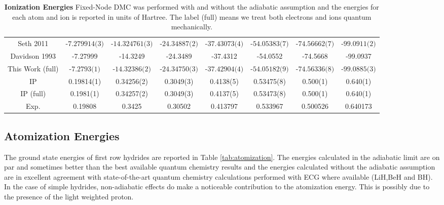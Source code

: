 \documentclass[aps,prl,superscriptaddress,groupedaddress]{revtex4}
\begin{document}
\begin{table*}[htpb!]
\begin{tabular}{*{1}{*{8}{c}}}
Seth 2011 \cite{Seth_Bench} & $\text{-7.279914(3)}$ & $\text{-14.324761(3)}$ & $\text{-24.34887(2)}$ & $\text{-37.43073(4)}$ & $\text{-54.05383(7)}$ & $\text{-74.56662(7)}$ & $\text{-99.0911(2)}$ \\
Davidson 1993 \footnotemark[1] \cite{Davidson_Atoms} & -7.27999 & -14.3249 & -24.3489 & -37.4312 & -54.0552 & -74.5668 & -99.0937 \\
This Work (full) & $\text{-7.2793(1)}$ & $\text{-14.32386(2)}$ & $\text{-24.34750(3)}$ & $\text{-37.42904(4)}$ & $\text{-54.05182(9)}$ & $\text{-74.56336(8)}$ & $\text{-99.0885(3)}$ \\
\hline
IP & 0.19814(1) & 0.34256(2) & 0.3049(3) & 0.4138(5) & 0.53475(8) & 0.500(1) & 0.640(1) \\
IP (full) & 0.1981(1) & 0.34257(2) & 0.3049(3) & 0.4137(5) & 0.53473(8) & 0.500(1) & 0.640(1) \\
Exp. \cite{Davidson_Atoms} & 0.19808 & 0.3425 & 0.30502 & 0.413797 & 0.533967 & 0.500526 & 0.640173 \\
\hline
\end{tabular}
\caption{\textbf{Ionization Energies} Fixed-Node DMC was performed with and without the adiabatic assumption and the energies for each atom and ion is reported in units of Hartree. The label (full) means we treat both electrons and ions quantum mechanically. \label{tab:ionization}}
\end{table*}
 
\subsection{Atomization Energies}
The ground state energies of first row hydrides are reported in Table \ref{tab:atomization}. The energies calculated in the adiabatic limit are on par and sometimes better than the best available quantum chemistry results \cite{Adamowicz_LiH,Koput_BeH,Miliordos_BH} and the energies calculated without the adiabatic assumption are in excellent agreement with state-of-the-art quantum chemistry calculations performed with ECG where available (LiH,BeH and BH). In the case of simple hydrides, non-adiabatic effects do make a noticeable contribution to the atomization energy. This is possibly due to the presence of the light weighted proton.
 
\end{document}

